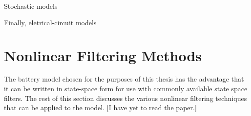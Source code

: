 
Stochastic models

Finally, eletrical-circuit models


\section{Nonlinear Filtering Methods}

The battery model chosen for the purposes of this thesis has the advantage that it can be written in state-space form for use with commonly available state space filters. The rest of this section discusses the various nonlinear filtering techniques that can be applied to the model. [I have yet to read the paper.]
